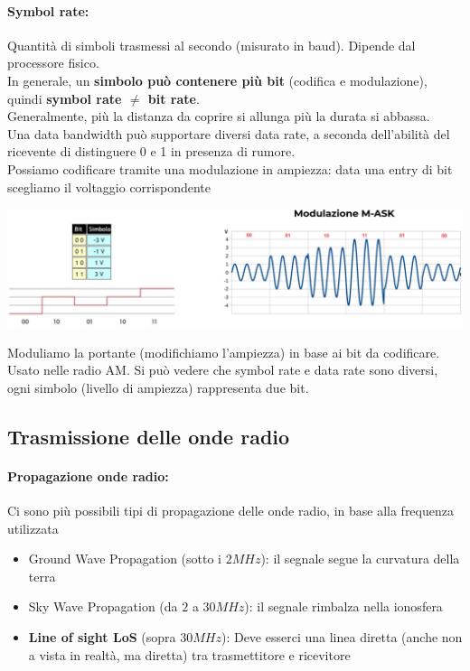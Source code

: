 \paragraph{Symbol rate:} Quantità di simboli trasmessi al secondo (misurato in baud). Dipende dal processore fisico.\\

In generale, un \textbf{simbolo può contenere più bit} (codifica e modulazione), quindi \textbf{symbol rate $\neq$ bit rate}.\\
Generalmente, più la distanza da coprire si allunga più la durata si abbassa.\\

Una data bandwidth può supportare diversi data rate, a seconda dell'abilità del ricevente di distinguere 0 e 1 in presenza di rumore.\\

Possiamo codificare tramite una modulazione in ampiezza: data una entry di bit scegliamo il voltaggio corrispondente
\begin{center}
	\includegraphics[width=\linewidth]{img/wireless/modam1}
\end{center}
Moduliamo la portante (modifichiamo l'ampiezza) in base ai bit da codificare. Usato nelle radio AM. Si può vedere che symbol rate e data rate sono diversi, ogni simbolo (livello di ampiezza) rappresenta due bit.\\

\newpage

\subsection{Trasmissione delle onde radio}

\paragraph{Propagazione onde radio:} Ci sono più possibili tipi di propagazione delle onde radio, in base alla frequenza utilizzata
\begin{itemize}
	\item Ground Wave Propagation (sotto i $2MHz$): il segnale segue la curvatura della terra
	\item Sky Wave Propagation (da $2$ a $30MHz$): il segnale rimbalza nella ionosfera
	\item \textbf{Line of sight LoS} (sopra $30MHz$): Deve esserci una linea diretta (anche non a vista in realtà, ma diretta) tra trasmettitore e ricevitore
\end{itemize}

